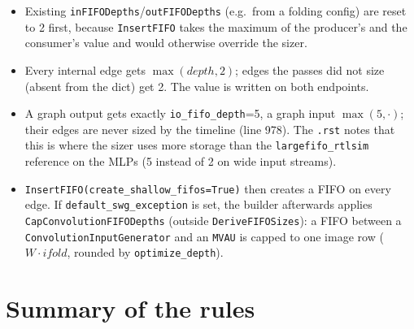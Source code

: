 \documentclass[10pt,a4paper]{article}
\newcommand{\code}[1]{\texttt{#1}}
\begin{document}
\begin{itemize}
\item Existing \code{inFIFODepths}/\code{outFIFODepths} (e.g.\ from a folding
  config) are reset to 2 first, because \code{InsertFIFO} takes the maximum of the
  producer's and the consumer's value and would otherwise override the sizer.
\item Every internal edge gets $\max(\mathit{depth},2)$; edges the passes did not size
  (absent from the dict) get 2. The value is written on both endpoints.
\item A graph output gets exactly \code{io\_fifo\_depth}=5, a graph input
  $\max(5,\cdot)$; their edges are never sized by the timeline (line 978). The
  \code{.rst} notes that this is where the sizer uses more storage than the
  \code{largefifo\_rtlsim} reference on the MLPs (5 instead of 2 on wide input streams).
\item \code{InsertFIFO(create\_shallow\_fifos=True)} then creates a FIFO on every edge.
  If \code{default\_swg\_exception} is set, the builder afterwards applies
  \code{CapConvolutionFIFODepths} (outside \code{DeriveFIFOSizes}): a FIFO between a
  \code{ConvolutionInputGenerator} and an \code{MVAU} is capped to one image row
  ($W\cdot\mathit{ifold}$, rounded by \code{optimize\_depth}).
\end{itemize}

\section{Summary of the rules}
\end{document}
